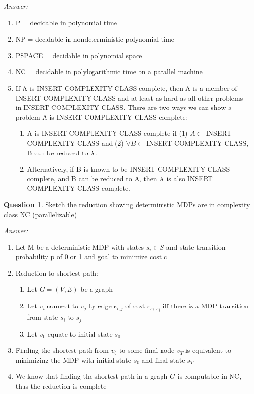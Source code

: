 \documentclass{article}
\theoremstyle{definition}
\newtheorem{question}[thm]{Question}
\newenvironment{answer}{\noindent\textit{Answer:}}{}
\begin{document}
\begin{answer}
    \begin{enumerate}
        \item P = decidable in polynomial time
        \item NP = decidable in nondeterministic polynomial time
        \item PSPACE = decidable in polynomial space
        \item NC = decidable in polylogarithmic time on a parallel machine
        \item If A is INSERT COMPLEXITY CLASS-complete, then A is a member of INSERT COMPLEXITY CLASS and at least as hard as all other problems in INSERT COMPLEXITY CLASS. There are two ways we can show a problem A is INSERT COMPLEXITY CLASS-complete:
        \begin{enumerate}
            \item A is INSERT COMPLEXITY CLASS-complete if (1) $A \in$ INSERT COMPLEXITY CLASS and (2) $\forall B \in$ INSERT COMPLEXITY CLASS, B can be reduced to A.
            \item Alternatively, if B is known to be INSERT COMPLEXITY CLASS-complete, and B can be reduced to A, then A is also INSERT COMPLEXITY CLASS-complete.
        \end{enumerate}
    \end{enumerate}
\end{answer}

\begin{question}
Sketch the reduction showing deterministic MDPs are in complexity class NC (parallelizable)
\end{question}

\begin{answer}
    \begin{enumerate}
        \item Let M be a deterministic MDP with states $s_i \in S$ and state transition probability p of 0 or 1 and goal to minimize cost c
        \item Reduction to shortest path:
            \begin{enumerate}
                \item Let $G=(V,E)$ be a graph
                \item Let $v_i$ connect to $v_j$ by edge $e_{i,j}$ of cost $c_{s_i,s_j}$ iff there is a MDP transition from state $s_i$ to $s_j$ 
                \item Let $v_0$ equate to initial state $s_0$ 
            \end{enumerate}
        \item Finding the shortest path from $v_0$ to some final node $v_T$ is equivalent to minimizing the MDP with initial state $s_0$ and final state $s_T$
        \item We know that finding the shortest path in a graph $G$ is computable in NC, thus the reduction is complete
    \end{enumerate}
\end{answer}
\end{document}
